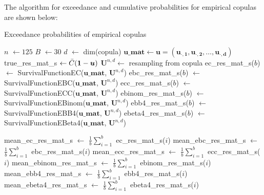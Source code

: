 \documentclass[12pt]{report}
\newcommand{\1}{\mathbf{1}}
\begin{document}
\begin{flushleft}
The algorithm for exceedance and cumulative probabilities for empirical copulas are shown below: \\
\begin{algorithm}[H]
\caption{Exceedance probabilities of empirical copulas}
\begin{algorithmic}
 
    \State $n$ $\gets 125$
    \State $B$ $\gets 30$
    \State $d$ $\gets$ dim(copula)
    \State $\boldsymbol{u\_mat} \gets \boldsymbol{u} = (\boldsymbol{u_{\cdot,1}}, \boldsymbol{u_{\cdot,2}}, \dots, \boldsymbol{u_{\cdot,d}})$ 
    \State true\_res\_mat\_s $\gets \Bar{C}(\boldsymbol{1} - \boldsymbol{u})$ 
        \State $\boldsymbol{U}^{n,d} \gets$ resampling from copula 
        \State ec\_res\_mat\_s($b$) $\gets$ SurvivalFunctionEC($\boldsymbol{u\_mat}$, $\textbf{U}^{n,d}$)
        \State ebc\_res\_mat\_s($b$) $\gets$ SurvivalFunctionEBC($\boldsymbol{u\_mat}$, $\textbf{U}^{n,d}$)
        \State ecc\_res\_mat\_s($b$) $\gets$ SurvivalFunctionECC($\boldsymbol{u\_mat}$, $\textbf{U}^{n,d}$)
        \State ebinom\_res\_mat\_s($b$) $\gets$ SurvivalFunctionEBinom($\boldsymbol{u\_mat}$, $\textbf{U}^{n,d}$)
        \State ebb4\_res\_mat\_s($b$) $\gets$ SurvivalFunctionEBB4($\boldsymbol{u\_mat}$, $\textbf{U}^{n,d}$)
        \State ebeta4\_res\_mat\_s($b$) $\gets$ SurvivalFunctionEBeta4($\boldsymbol{u\_mat}$, $\textbf{U}^{n,d}$)

    \EndFor
    \State mean\_ec\_res\_mat\_s $\gets$ $\frac{1}{b}\sum\limits_{i = 1}^{b}$ ec\_res\_mat\_s($i$)
    \State mean\_ebc\_res\_mat\_s $\gets$ $\frac{1}{b}\sum\limits_{i = 1}^{b}$ ebc\_res\_mat\_s($i$)
    \State mean\_ecc\_res\_mat\_s $\gets$ $\frac{1}{b}\sum\limits_{i = 1}^{b}$ ecc\_res\_mat\_s($i$)
    \State mean\_ebinom\_res\_mat\_s $\gets$ $\frac{1}{b}\sum\limits_{i = 1}^{b}$ ebinom\_res\_mat\_s($i$)
    \State mean\_ebb4\_res\_mat\_s $\gets$ $\frac{1}{b}\sum\limits_{i = 1}^{b}$ ebb4\_res\_mat\_s($i$)
    \State mean\_ebeta4\_res\_mat\_s $\gets$ $\frac{1}{b}\sum\limits_{i = 1}^{b}$ ebeta4\_res\_mat\_s($i$)


\end{algorithmic}
\end{algorithm}
\end{flushleft}
\end{document}
